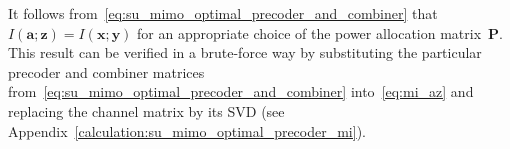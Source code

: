 It follows from~\eqref{eq:su_mimo_optimal_precoder_and_combiner} that $I(\mathbf{a}; \mathbf{z}) = I(\mathbf{x}; \mathbf{y})$ for an appropriate choice of the power allocation matrix~$\mathbf{P}$.
This result can be verified in a brute-force way by substituting the particular precoder and combiner matrices from~\eqref{eq:su_mimo_optimal_precoder_and_combiner} into~\eqref{eq:mi_az} and replacing the channel matrix by its \ac{SVD} (see Appendix~\ref{calculation:su_mimo_optimal_precoder_mi}).

